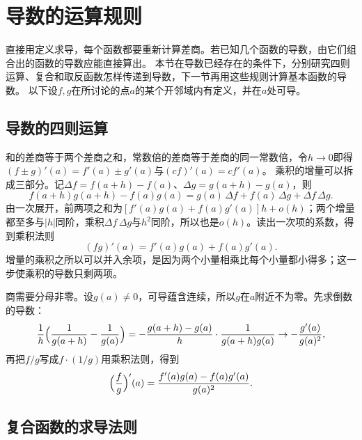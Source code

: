 \section{导数的运算规则}
\label{sec:ru-derivative-rules}
\label{sec:analysis-scalar-chain-rules}

直接用定义求导，每个函数都要重新计算差商。若已知几个函数的导数，由它们组合出的函数的导数应能直接算出。
本节在导数已经存在的条件下，分别研究四则运算、复合和取反函数怎样传递到导数，下一节再用这些规则计算基本函数的导数。
以下设$f,g$在所讨论的点$a$的某个开邻域内有定义，并在$a$处可导。

\subsection{导数的四则运算}
\label{sec:ru-derivative-arithmetic}

和的差商等于两个差商之和，常数倍的差商等于差商的同一常数倍，令$h\to0$即得$(f\pm g)'(a)=f'(a)\pm g'(a)$与$(cf)'(a)=cf'(a)$。
乘积的增量可以拆成三部分。记$\Delta f=f(a+h)-f(a)$、$\Delta g=g(a+h)-g(a)$，则
\[
 f(a+h)g(a+h)-f(a)g(a)=g(a)\,\Delta f+f(a)\,\Delta g+\Delta f\,\Delta g.
\]
由一次展开，前两项之和为$[f'(a)g(a)+f(a)g'(a)]h+o(h)$；两个增量都至多与$|h|$同阶，乘积$\Delta f\,\Delta g$与$h^2$同阶，所以也是$o(h)$。读出一次项的系数，得到乘积法则
\begin{equation}
 (fg)'(a)=f'(a)g(a)+f(a)g'(a).
 \label{eq:analysis-scalar-sum-product-rules}
\end{equation}
增量的乘积之所以可以并入余项，是因为两个小量相乘比每个小量都小得多；这一步使乘积的导数只剩两项。

商需要分母非零。设$g(a)\neq0$，可导蕴含连续，所以$g$在$a$附近不为零。先求倒数的导数：
\[
 \frac1h\Bigl(\frac1{g(a+h)}-\frac1{g(a)}\Bigr)=-\frac{g(a+h)-g(a)}h\cdot\frac1{g(a+h)g(a)}\to-\frac{g'(a)}{g(a)^2},
\]
再把$f/g$写成$f\cdot(1/g)$用乘积法则，得到
\[
 \Bigl(\frac fg\Bigr)'(a)=\frac{f'(a)g(a)-f(a)g'(a)}{g(a)^2}.
\]

\subsection{复合函数的求导法则}
\label{sec:ru-chain-rule}

